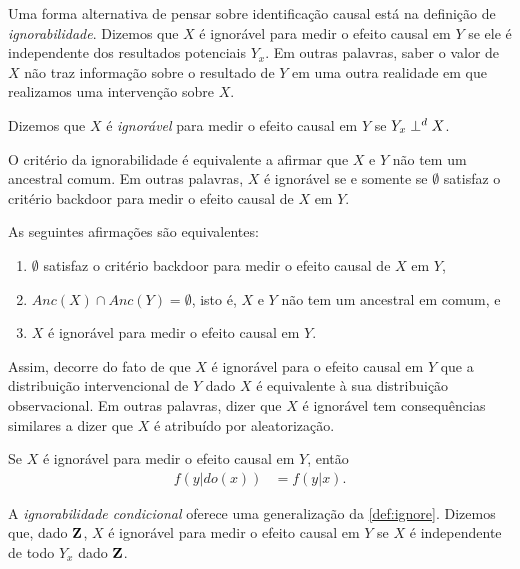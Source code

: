 Uma forma alternativa de pensar sobre
identificação causal está
na definição de \textit{ignorabilidade}.
Dizemos que $X$ é ignorável para
medir o efeito causal em $Y$ se
ele é independente dos resultados potenciais $Y_{x}$.
Em outras palavras, 
saber o valor de $X$ não traz informação sobre
o resultado de $Y$ em uma outra realidade em que
realizamos uma intervenção sobre $X$.

\begin{definition}[Ignorabilidade]
 \label{def:ignore}
 Dizemos que $X$ é \textit{ignorável} para
 medir o efeito causal em $Y$ se
 $Y_x \perp^d X$.
\end{definition}

O critério da ignorabilidade é equivalente a
afirmar que $X$ e $Y$ não tem um ancestral comum.
Em outras palavras, $X$ é ignorável se
e somente se $\emptyset$ satisfaz o critério backdoor para
medir o efeito causal de $X$ em $Y$.

\begin{lemma}
 \label{lemma:ignore_backdoor}
 As seguintes afirmações são equivalentes:
 \begin{enumerate}
  \item $\emptyset$ satisfaz o critério backdoor para
  medir o efeito causal de $X$ em $Y$,
  \item $Anc(X) \cap Anc(Y) = \emptyset$, isto é,
  $X$ e $Y$ não tem um ancestral em comum, e
  \item $X$ é ignorável para medir o efeito causal em $Y$.
 \end{enumerate}
\end{lemma}

Assim, decorre do fato de que $X$ é ignorável para 
o efeito causal em $Y$ que
a distribuição intervencional de $Y$ dado $X$ é
equivalente à sua distribuição observacional.
Em outras palavras, dizer que $X$ é ignorável tem
consequências similares a dizer que
$X$ é atribuído por aleatorização.

\begin{corollary}
 \label{cor:ignore}
 Se $X$ é ignorável para medir o efeito causal em $Y$, então
 \begin{align*}
  f(y|do(x)) &= f(y|x).
 \end{align*}
\end{corollary}

A \textit{ignorabilidade condicional} oferece
uma generalização da \cref{def:ignore}.
Dizemos que, dado ${\mathbf{Z}}$, 
$X$ é ignorável para medir o efeito causal em $Y$ se
$X$ é independente de todo $Y_x$ dado ${\mathbf{Z}}$.

